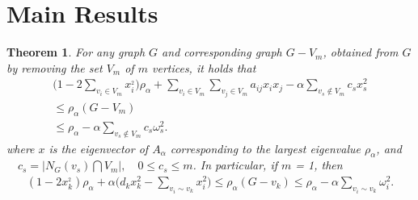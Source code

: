\documentclass[amsthm]{elsart}
\newtheorem{theorem}{Theorem}[section]
\begin{document}
\section{Main Results}
\begin{theorem}
For any graph $G$ and corresponding graph $G - V_m$, obtained from $G$ by removing
the set $V_m$ of $m$ vertices, it holds that
\begin{eqnarray} \label{equ:1}
\nonumber \big(1 - 2\sum \limits_{v_i \in V_m}^{} x_i^{_2} \big) \rho_\alpha
+ \sum \limits_{v_i \in V_m}^{} \sum \limits_{v_j \in V_m}^{} a_{ij}x_ix_j
- \alpha \sum \limits_{v_s \notin V_m}^{} c_s x_s^2
\\ \nonumber \leqslant \rho_\alpha(G - V_m) \qquad \;\,
\\  \leqslant  \rho_\alpha - \alpha \sum \limits_{v_s \notin V_m}^{} c_s \omega_s^2.
\end{eqnarray}
where $x$ is the eigenvector of $A_\alpha$ corresponding to the largest eigenvalue $\rho_\alpha$, and $\quad c_s = |N_G(v_s) \bigcap V_m|, \quad 0\leqslant c_s \leqslant m$. In particular, if $m$ = 1, then
\begin{eqnarray} \label{equ:2}
(1 - 2x_k^{_2})\rho_\alpha
+ \alpha \big(d_k x_k^2 - \sum \limits_{v_i \sim v_k}^{} x_i^2 \big)
\leqslant \rho_\alpha(G - v_k)
\leqslant  \rho_\alpha - \alpha \sum \limits_{v_i \sim v_k}^{} \omega_i^2.
\end{eqnarray}
\end{theorem}
\end{document}
